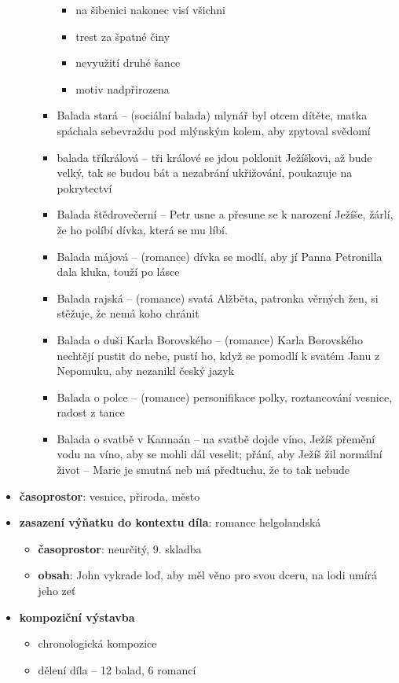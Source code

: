 \documentclass[10pt,a4paper]{article}
\begin{document}
\begin{itemize}
\begin{itemize}
\begin{itemize}
\begin{itemize}
			\item na šibenici nakonec visí všichni
			\item trest za špatné činy
			\item nevyužití druhé šance
			\item motiv nadpřirozena
			\end{itemize}
		\item Balada stará -- (sociální balada) mlynář byl otcem dítěte, matka spáchala sebevraždu pod mlýnským kolem, aby zpytoval svědomí
		\item balada tříkrálová -- tři králové se jdou poklonit Ježíškovi, až bude velký, tak se budou bát a nezabrání ukřižování, poukazuje na pokrytectví
		\item Balada štědrovečerní -- Petr usne a přesune se k narození Ježíše, žárlí, že ho políbí dívka, která se mu líbí.
		\item Balada májová -- (romance) dívka se modlí, aby jí Panna Petronilla dala kluka, touží po lásce
		\item Balada rajská -- (romance) svatá Alžběta, patronka věrných žen, si stěžuje, že nemá koho chránit
		\item Balada o duši Karla Borovského -- (romance) Karla Borovského nechtějí pustit do nebe, pustí ho, když se pomodlí k svatém Janu z Nepomuku, aby nezanikl český jazyk
		\item Balada o polce -- (romance) personifikace polky, roztancování vesnice, radost z tance
		\item Balada o svatbě v Kannaán -- na svatbě dojde víno, Ježíš přemění vodu na víno, aby se mohli dál veselit; přání, aby Ježíš žil normální život – Marie je smutná neb má předtuchu, že to tak nebude
		\end{itemize}
	\end{itemize}
\item \textbf{časoprostor}: vesnice, přiroda, město
\item \textbf{zasazení výňatku do kontextu díla}: romance helgolandská
	\begin{itemize}
	\item \textbf{časoprostor}: neurčitý, 9. skladba
	\item \textbf{obsah}: John vykrade loď, aby měl věno pro svou dceru, na lodi umírá jeho zeť
	\end{itemize}
\item \textbf{kompoziční výstavba}
	\begin{itemize}
	\item chronologická kompozice
	\item dělení díla -- 12 balad, 6 romancí
	\end{itemize}
\end{itemize}
\end{document}
